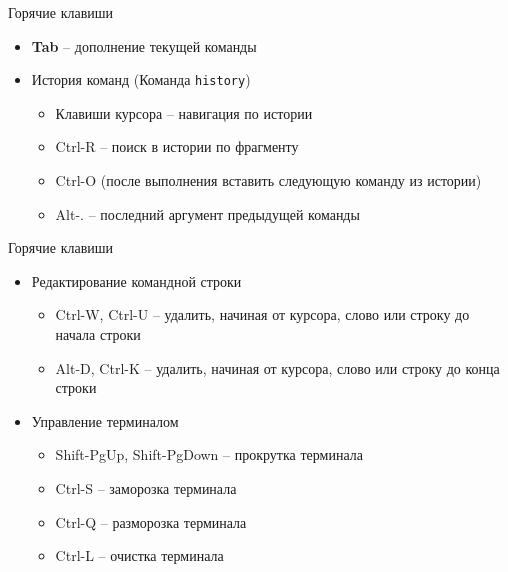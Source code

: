 \begin{frame}{Горячие клавиши}
  \begin{itemize}
    \item \textbf{Tab} -- дополнение текущей команды
      \pause
    \item История команд (Команда {\tt history})
      \begin{itemize}
        \item Клавиши курсора -- навигация по истории
        \item Ctrl-R -- поиск в истории по фрагменту
        \item Ctrl-O (после выполнения вставить следующую команду из истории)
        \item Alt-.  -- последний аргумент предыдущей команды
      \end{itemize}
  \end{itemize}
\end{frame}

\begin{frame}{Горячие клавиши}
   \begin{itemize}
    \item Редактирование командной строки
      \begin{itemize}
        \item Ctrl-W, Ctrl-U -- удалить, начиная от курсора, слово или строку до начала строки
        \item Alt-D, Ctrl-K -- удалить, начиная от курсора, слово или строку до конца строки
      \end{itemize}
    \item Управление терминалом
      \begin{itemize}
        \item Shift-PgUp, Shift-PgDown -- прокрутка терминала
        \item Ctrl-S -- заморозка терминала
        \item Ctrl-Q -- разморозка терминала
        \item Ctrl-L -- очистка терминала
      \end{itemize}
  \end{itemize}
\end{frame}

